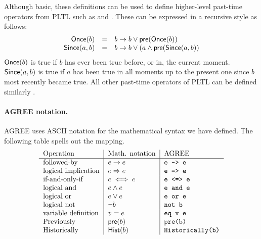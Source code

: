 Although basic, these definitions can be used to define higher-level
past-time operators from PLTL such as  and .
These can be expressed in a recursive style as follows:
\[
\begin{array}{rcl}
\mathsf{Once}(b) & = & b \to b \vee \mathsf{pre}(\mathsf{Once}(b)) \\
\mathsf{Since}(a, b) & = & b \to b \lor (a \land \mathsf{pre}(\mathsf{Since}(a, b))
\end{array}
\]
\noindent $\mathsf{Once}(b)$ is true if $b$ has ever been true before, or in, the
current moment.  $\mathsf{Since}(a, b)$ is true if $a$ has been true in
all moments up to the present one since $b$ most recently became true.
All other past-time operators of PLTL can be defined similarly \cite{monitor}.

\paragraph{AGREE notation.}
AGREE uses ASCII notation for the mathematical syntax we have
defined. The following table spells out the mapping.
\[
\begin{tabular}{l|l|l}
 Operation & Math. notation & AGREE \\ \hline
 followed-by &  $e \to e$          & \verb+e -> e+  \\
 logical implication &  $e \imp e$ & \verb+e => e+ \\
 if-and-only-if &  $e \iff e$      & \verb+e <=> e+ \\
 logical and &  $e \land e$      & \verb+e and e+ \\
 logical or &  $e \lor e$      & \verb+e or e+ \\
 logical not & $\neg b$      & \verb+not b+ \\
 variable definition & $v = e$     & \verb+eq v e+ \\
 Previously  & $\konst{pre}(b)$ & \verb+pre(b)+ \\
 Historically  & $\konst{Hist}(b)$ & \verb+Historically(b)+ \\
\end{tabular}
\]

